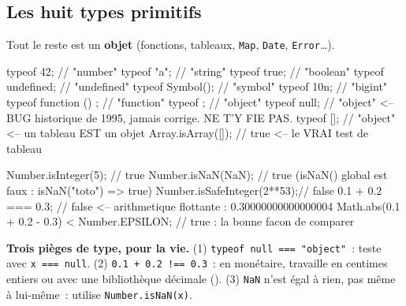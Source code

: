\subsection{Les huit types primitifs}


Tout le reste est un \textbf{objet} (fonctions, tableaux, \verb|Map|, \verb|Date|, \verb|Error|\ldots).

\begin{codejs}
typeof 42;              // "number"
typeof "a";             // "string"
typeof true;            // "boolean"
typeof undefined;       // "undefined"
typeof Symbol();        // "symbol"
typeof 10n;             // "bigint"
typeof function () {};  // "function"
typeof {};              // "object"
typeof null;            // "object"  <-- BUG historique de 1995, jamais corrige. NE T'Y FIE PAS.
typeof [];              // "object"  <-- un tableau EST un objet
Array.isArray([]);      // true  <-- le VRAI test de tableau

Number.isInteger(5);        // true
Number.isNaN(NaN);          // true   (isNaN() global est faux : isNaN("toto") => true)
Number.isSafeInteger(2**53);// false
0.1 + 0.2 === 0.3;          // false  <-- arithmetique flottante : 0.30000000000000004
Math.abs(0.1 + 0.2 - 0.3) < Number.EPSILON;   // true : la bonne facon de comparer
\end{codejs}

\begin{piege}
\textbf{Trois pi\`eges de type, pour la vie.}
(1) \verb|typeof null === "object"|~: teste avec \verb|x === null|.
(2) \verb|0.1 + 0.2 !== 0.3|~: en mon\'etaire, travaille en centimes entiers ou avec une
biblioth\`eque d\'ecimale ().
(3) \verb|NaN| n'est \'egal \`a rien, pas m\^eme \`a lui-m\^eme~: utilise \verb|Number.isNaN(x)|.
\end{piege}

